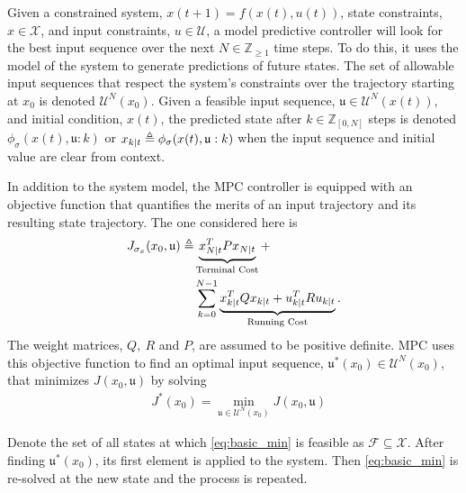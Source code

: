 Given a constrained system, $x(t+1)=f(x(t),u(t))$, state constraints, $x\in\mathcal{X}$, and input constraints, $u\in\mathcal{U}$, a model predictive controller will look for the best input sequence over the next $N\in\mathbb{Z}_{\geq1}$ time steps. To do this, it uses the model of the system to generate predictions of future states. The set of allowable input sequences that respect the system's constraints over the trajectory starting at $x_0$ is denoted $\mathcal{U}^N(x_0)$. Given a feasible input sequence, $ \mathfrak{u}\in\mathcal{U}^{N}(x(t))$, and initial condition, $x(t)$, the  predicted state after $k\in\mathbb{Z}_{[0,N]}$ steps is denoted $\phi_\sigma(x(t),\mathfrak{u}:k)$ or $x_{k|t} \triangleq \phi_\sigma(x(t),\mathfrak{u}:k)$ when the input sequence and initial value are clear from context. 

In addition to the system model, the MPC controller is equipped with an objective function that quantifies the merits of an input trajectory and its resulting state trajectory. The one considered here is
\begin{align}  \label{eq:objective_fun}
    J_{\sigma_{x}}(x_0,\mathfrak{u})\triangleq& \underbrace{x_{N|t}^TP x_{N|t}}_{\text{Terminal Cost}}+\\
    &\sum_{k=0}^{N-1} \underbrace{x_{k|t}^TQ x_{k|t}+u_{k|t}^TR u_{k|t}}_{\text{Running Cost}}.\nonumber
\end{align}
The weight matrices, $Q,\ R$ and $P$, are assumed to be positive definite. MPC uses this objective function to find an optimal input sequence, $\mathfrak{u}^*(x_0)\in\mathcal{U}^N(x_0)$, that minimizes $J(x_0,\mathfrak{u})$ by solving
\begin{align}\label{eq:basic_min}
&J^*(x_0)=\min_{\mathfrak{u}\in\mathcal{U}^{N}(x_0)}J(x_0,\mathfrak{u})
\end{align}

Denote the set of all states at which \eqref{eq:basic_min} is feasible as $\mathcal{F} \subseteq \mathcal{X}$. After finding $\mathfrak{u}^*(x_0)$, its first element is applied to the system. Then \eqref{eq:basic_min} is re-solved at the new state and the process is repeated. %